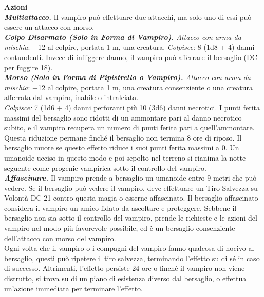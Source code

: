 \begin{multicols}{2}
\smallskip\textbf{Azioni}\\
\emph{\textbf{Multiattacco.}} Il vampiro può effettuare due attacchi, ma solo uno di essi può essere un attacco con morso.\\
\emph{\textbf{Colpo Disarmato (Solo in Forma di Vampiro).} Attacco con arma da mischia}: +12 al colpire, portata 1 m, una creatura. \emph{Colpisce:} 8 (1d8 + 4) danni contundenti. Invece di infliggere danno, il vampiro può afferrare il bersaglio (DC per fuggire 18).\\
\emph{\textbf{Morso (Solo in Forma di Pipistrello o Vampiro).} Attacco con arma da mischia}: +12 al colpire, portata 1 m, una creatura consenziente o una creatura afferrata dal vampiro, inabile o intralciata.\\

\emph{Colpisce:} 7 (1d6 + 4) danni perforanti più 10 (3d6) danni necrotici. I punti ferita massimi del bersaglio sono ridotti di un ammontare pari al danno necrotico subito, e il vampiro recupera un numero di punti ferita pari a quell'ammontare. Questa riduzione permane finché il bersaglio non termina 8 ore di riposo. Il bersaglio muore se questo effetto riduce i suoi punti ferita massimi a 0. Un umanoide ucciso in questo modo e poi sepolto nel terreno si rianima la notte seguente come progenie vampirica sotto il controllo del vampiro. \\

\emph{\textbf{Affascinare.}} Il vampiro prende a bersaglio un umanoide entro 9 metri che può vedere. Se il bersaglio può vedere il vampiro, deve effettuare un Tiro Salvezza su Volontà DC  21 contro questa magia o esserne affascinato. Il bersaglio affascinato considera il vampiro un amico fidato da ascoltare e proteggere. Sebbene il bersaglio non sia sotto il controllo del vampiro, prende le richieste e le azioni del vampiro nel modo più favorevole possibile, ed è un bersaglio consenziente dell'attacco con morso del vampiro.\\

Ogni volta che il vampiro o i compagni del vampiro fanno qualcosa di nocivo al bersaglio, questi può ripetere il tiro salvezza, terminando l'effetto su di sé in caso di successo. Altrimenti, l'effetto persiste 24 ore o finché il vampiro non viene distrutto, si trova su di un piano di esistenza diverso dal bersaglio, o effettua un'azione immediata per terminare l'effetto.\\


\end{multicols}
